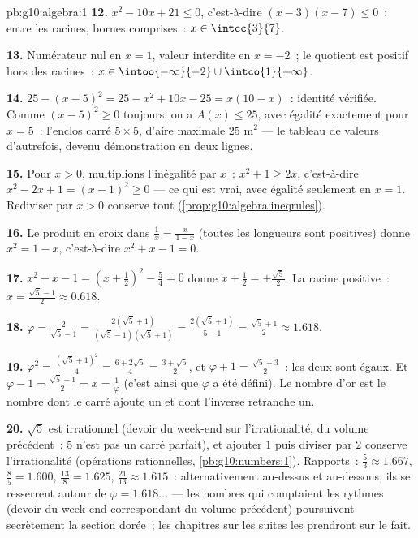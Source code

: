 \begin{solution}{pb:g10:algebra:1}
\textbf{12.} $x^2 - 10x + 21 \leq 0$, c'est-à-dire
$(x - 3)(x - 7) \leq 0$~: entre les racines, bornes comprises~:
$x \in \intcc{3}{7}$.

\textbf{13.} Numérateur nul en $x = 1$, valeur interdite en $x = -2$~;
le quotient est positif hors des racines~:
$x \in \intoo{-\infty}{-2} \cup \intco{1}{+\infty}$.

\textbf{14.} $25 - (x - 5)^2 = 25 - x^2 + 10x - 25 = x(10 - x)$~:
identité vérifiée. Comme $(x-5)^2 \geq 0$ toujours, on a
$A(x) \leq 25$, avec égalité exactement pour $x = 5$~: l'enclos carré
$5 \times 5$, d'aire maximale $25$ m$^2$ --- le tableau de valeurs
d'autrefois, devenu démonstration en deux lignes.

\textbf{15.} Pour $x > 0$, multiplions l'inégalité par $x$~:
$x^2 + 1 \geq 2x$, c'est-à-dire $x^2 - 2x + 1 = (x - 1)^2 \geq 0$ ---
ce qui est vrai, avec égalité seulement en $x = 1$. Rediviser par
$x > 0$ conserve tout (\cref{prop:g10:algebra:ineqrules}).

\textbf{16.} Le produit en croix dans $\frac1x = \frac{x}{1 - x}$
(toutes les longueurs sont positives) donne $x^2 = 1 - x$,
c'est-à-dire $x^2 + x - 1 = 0$.

\textbf{17.} $x^2 + x - 1 = \left(x + \frac12\right)^2 - \frac54 = 0$
donne $x + \frac12 = \pm\frac{\sqrt5}{2}$. La racine positive~:
$x = \frac{\sqrt5 - 1}{2} \approx 0.618$.

\textbf{18.} $\varphi = \frac{2}{\sqrt5 - 1} =
\frac{2(\sqrt5 + 1)}{(\sqrt5 - 1)(\sqrt5 + 1)}
= \frac{2(\sqrt5 + 1)}{5 - 1} = \frac{\sqrt5 + 1}{2}
\approx 1.618$.

\textbf{19.} $\varphi^2 = \frac{(\sqrt5 + 1)^2}{4} =
\frac{6 + 2\sqrt5}{4} = \frac{3 + \sqrt5}{2}$, et
$\varphi + 1 = \frac{\sqrt5 + 3}{2}$~: les deux sont égaux. Et
$\varphi - 1 = \frac{\sqrt5 - 1}{2} = x = \frac1\varphi$ (c'est ainsi
que $\varphi$ a été défini). Le nombre d'or est le nombre dont le
carré ajoute un et dont l'inverse retranche un.

\textbf{20.} $\sqrt5$ est irrationnel (devoir du week-end sur
l'irrationalité, du volume précédent~: $5$ n'est pas un carré
parfait), et ajouter $1$ puis diviser par $2$ conserve
l'irrationalité (opérations rationnelles,
\cref{pb:g10:numbers:1}). Rapports~: $\frac53 \approx 1.667$,
$\frac85 = 1.600$, $\frac{13}{8} = 1.625$,
$\frac{21}{13} \approx 1.615$~: alternativement au-dessus et
au-dessous, ils se resserrent autour de $\varphi = 1.618\ldots$ ---
les nombres qui comptaient les rythmes (devoir du week-end
correspondant du volume précédent) poursuivent secrètement la section
dorée~; les chapitres sur les suites les prendront sur le fait.
\end{solution}
